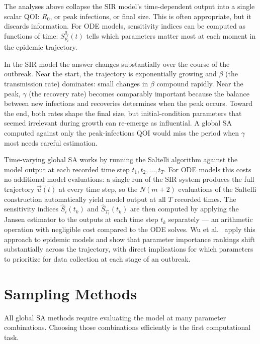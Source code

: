 The analyses above collapse the SIR model's time-dependent output into a
single scalar QOI: $R_0$, or peak infections, or final size.
This is often appropriate, but it discards information.
For ODE models, sensitivity indices can be computed as functions of time:
$S_{p_i}^{q_j}(t)$ tells which parameters matter most at each moment
in the epidemic trajectory.

In the SIR model the answer changes substantially over the course of the outbreak.
Near the start, the trajectory is exponentially growing and $\beta$ (the
transmission rate) dominates: small changes in $\beta$ compound rapidly.
Near the peak, $\gamma$ (the recovery rate) becomes comparably important
because the balance between new infections and recoveries determines when
the peak occurs.
Toward the end, both rates shape the final size, but initial-condition
parameters that seemed irrelevant during growth can re-emerge as influential.
A global SA computed against only the peak-infections QOI would miss
the period when $\gamma$ most needs careful estimation.

Time-varying global SA works by running the Saltelli algorithm against the
model output at each recorded time step $t_1, t_2, \ldots, t_T$.
For ODE models this costs no additional model evaluations: a single run
of the SIR system produces the full trajectory $\vec{u}(t)$ at every
time step, so the $N(m+2)$ evaluations of the Saltelli construction
automatically yield model output at all $T$ recorded times.
The sensitivity indices $\hat{S}_i(t_k)$ and $\hat{S}_{T_i}(t_k)$ are
then computed by applying the Jansen estimator to the outputs at each
time step $t_k$ separately --- an arithmetic operation with negligible
cost compared to the ODE solves.
Wu et al.~\cite{wu2013sensitivity} apply this approach to epidemic models
and show that parameter importance rankings shift substantially across the
trajectory, with direct implications for which parameters to prioritize for
data collection at each stage of an outbreak.

\section{Sampling Methods}
\label{sec:sampling}

All global SA methods require evaluating the model at many parameter
combinations. Choosing those combinations efficiently is the first
computational task.

